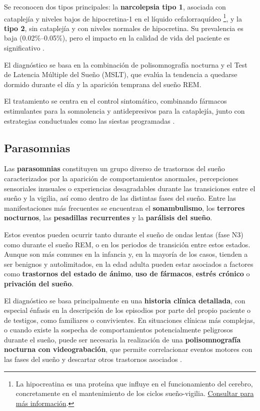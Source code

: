 Se reconocen dos tipos principales: la \textbf{narcolepsia tipo 1}, asociada con cataplejía y niveles bajos de hipocretina-1 en el líquido cefalorraquídeo \footnote{La hipocreatina es una proteína que influye en el funcionamiento del cerebro, concretamente en el mantenimiento de los ciclos sueño-vigilia. \href{https://sebbm.es/moleculas-de-la-vida/hipocretina/}{Consultar para más información}.}, y la \textbf{tipo 2}, sin cataplejía y con niveles normales de hipocretina. Su prevalencia es baja (0.02\%–0.05\%), pero el impacto en la calidad de vida del paciente es significativo \cite{mayoclinic_apnea}.

El diagnóstico se basa en la combinación de polisomnografía nocturna y el Test de Latencia Múltiple del Sueño (MSLT), que evalúa la tendencia a quedarse dormido durante el día y la aparición temprana del sueño REM.

El tratamiento se centra en el control sintomático, combinando fármacos estimulantes para la somnolencia y antidepresivos para la cataplejía, junto con estrategias conductuales como las siestas programadas \cite{pabon2010narcolepsia}.

   


\subsection{Parasomnias}

Las \textbf{parasomnias} constituyen un grupo diverso de trastornos del sueño caracterizados por la aparición de comportamientos anormales, percepciones sensoriales inusuales o experiencias desagradables durante las transiciones entre el sueño y la vigilia, así como dentro de las distintas fases del sueño. Entre las manifestaciones más frecuentes se encuentran el \textbf{sonambulismo}, los \textbf{terrores nocturnos}, las \textbf{pesadillas recurrentes} y la \textbf{parálisis del sueño}.

Estos eventos pueden ocurrir tanto durante el sueño de ondas lentas (fase N3) como durante el sueño REM, o en los periodos de transición entre estos estados. Aunque son más comunes en la infancia y, en la mayoría de los casos, tienden a ser benignos y autolimitados, en la edad adulta pueden estar asociados a factores como \textbf{trastornos del estado de ánimo}, \textbf{uso de fármacos}, \textbf{estrés crónico} o \textbf{privación del sueño}.

El diagnóstico se basa principalmente en una \textbf{historia clínica detallada}, con especial énfasis en la descripción de los episodios por parte del propio paciente o de testigos, como familiares o convivientes. En situaciones clínicas más complejas, o cuando existe la sospecha de comportamientos potencialmente peligrosos durante el sueño, puede ser necesaria la realización de una \textbf{polisomnografía nocturna con videograbación}, que permite correlacionar eventos motores con las fases del sueño y descartar otros trastornos asociados \cite{singh2018parasomnias}.




